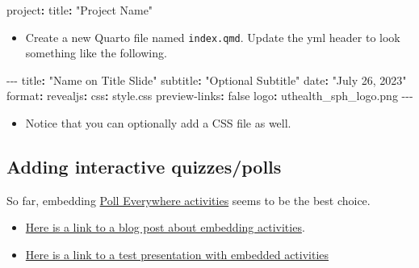 \documentclass[
  letterpaper,
  DIV=11,
  numbers=noendperiod]{scrreprt}
\newenvironment{Shaded}{\begin{snugshade}}{\end{snugshade}}
\newcommand{\AttributeTok}[1]{\textcolor[rgb]{0.40,0.45,0.13}{#1}}
\newcommand{\CharTok}[1]{\textcolor[rgb]{0.13,0.47,0.30}{#1}}
\newcommand{\FunctionTok}[1]{\textcolor[rgb]{0.28,0.35,0.67}{#1}}
\newcommand{\KeywordTok}[1]{\textcolor[rgb]{0.00,0.23,0.31}{\textbf{#1}}}
\newcommand{\PreprocessorTok}[1]{\textcolor[rgb]{0.68,0.00,0.00}{#1}}
\newcommand{\StringTok}[1]{\textcolor[rgb]{0.13,0.47,0.30}{#1}}
\providecommand{\tightlist}{%
  \setlength{\itemsep}{0pt}\setlength{\parskip}{0pt}}\usepackage{longtable,booktabs,array}
\begin{document}
\begin{Shaded}
\begin{Highlighting}[]
\FunctionTok{project}\KeywordTok{:}
\AttributeTok{  }\FunctionTok{title}\KeywordTok{:}\AttributeTok{ }\StringTok{"Project Name"}
\end{Highlighting}
\end{Shaded}

\begin{itemize}
\tightlist
\item
  Create a new Quarto file named \texttt{index.qmd}. Update the yml
  header to look something like the following.
\end{itemize}

\begin{Shaded}
\begin{Highlighting}[]
\PreprocessorTok{{-}{-}{-}}
\FunctionTok{title}\KeywordTok{:}\AttributeTok{ }\StringTok{"Name on Title Slide"}
\FunctionTok{subtitle}\KeywordTok{:}\AttributeTok{ }\StringTok{"Optional Subtitle"}
\FunctionTok{date}\KeywordTok{:}\AttributeTok{ }\StringTok{"July 26, 2023"}
\FunctionTok{format}\KeywordTok{:}\AttributeTok{ }
\AttributeTok{  }\FunctionTok{revealjs}\KeywordTok{:}
\AttributeTok{    }\FunctionTok{css}\KeywordTok{:}\AttributeTok{ style.css}
\AttributeTok{    }\FunctionTok{preview{-}links}\KeywordTok{:}\AttributeTok{ }\CharTok{false}
\FunctionTok{logo}\KeywordTok{:}\AttributeTok{ uthealth\_sph\_logo.png}
\PreprocessorTok{{-}{-}{-}}
\end{Highlighting}
\end{Shaded}

\begin{itemize}
\tightlist
\item
  Notice that you can optionally add a CSS file as well.
\end{itemize}

\subsection{Adding interactive
quizzes/polls}\label{adding-interactive-quizzespolls}

So far, embedding \href{https://www.polleverywhere.com/activities}{Poll
Everywhere activities} seems to be the best choice.

\begin{itemize}
\tightlist
\item
  \href{https://support.polleverywhere.com/hc/en-us/articles/1260801821849-Embed-an-activity}{Here
  is a link to a blog post about embedding activities}.
\item
  \href{https://github.com/brad-cannell/test_quarto_revealjs}{Here is a
  link to a test presentation with embedded activities}
\end{itemize}
\end{document}
